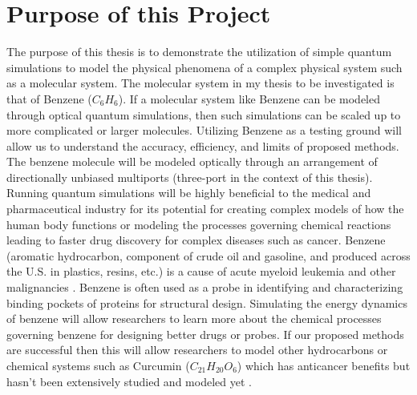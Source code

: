 \section{Purpose of this Project}
The purpose of this thesis is to demonstrate the utilization of simple quantum simulations to model the physical phenomena of a complex physical system such as a molecular system. The molecular system in my thesis to be investigated is that of Benzene ($C_{6}H_{6}$). If a molecular system like Benzene can be modeled through optical quantum simulations, then such simulations can be scaled up to more complicated or larger molecules. Utilizing Benzene as a testing ground will allow us to understand the accuracy, efficiency, and limits of proposed methods. The benzene molecule will be modeled optically through an arrangement of directionally unbiased multiports (three-port in the context of this thesis). 
Running quantum simulations will be highly beneficial to the medical and pharmaceutical industry for its potential for creating complex models of how the human body functions or modeling the processes governing chemical reactions leading to faster drug discovery for complex diseases such as cancer. Benzene (aromatic hydrocarbon, component of crude oil and gasoline, and produced across the U.S. in plastics, resins, etc.) is a cause of acute myeloid leukemia and other malignancies \cite{doi:10.1093/carcin/bgr297}. Benzene is often used as a probe in identifying and characterizing binding pockets of proteins for structural design. Simulating the energy dynamics of benzene will allow researchers to learn more about the chemical processes governing benzene for designing better drugs or probes. If our proposed methods are successful then this will allow researchers to model other hydrocarbons or chemical systems such as Curcumin ($C_{21}H_{20}O_{6}$) which has anticancer benefits but hasn't been extensively studied and modeled yet \cite{article}. 

